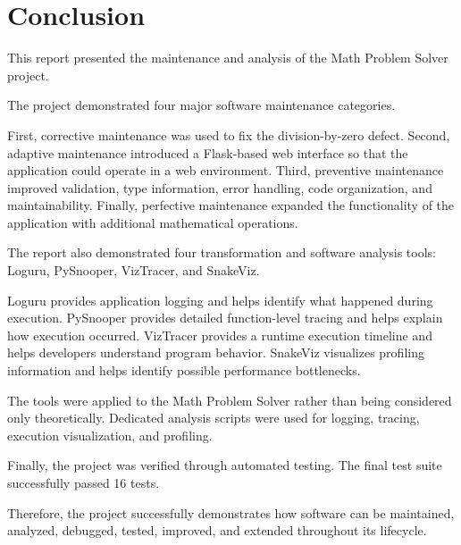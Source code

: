 \documentclass[12pt,a4paper]{report}
\begin{document}
\chapter{Conclusion}

This report presented the maintenance and analysis of the Math Problem
Solver project.

The project demonstrated four major software maintenance categories.

First, corrective maintenance was used to fix the division-by-zero
defect. Second, adaptive maintenance introduced a Flask-based web
interface so that the application could operate in a web environment.
Third, preventive maintenance improved validation, type information,
error handling, code organization, and maintainability. Finally,
perfective maintenance expanded the functionality of the application
with additional mathematical operations.

The report also demonstrated four transformation and software analysis
tools: Loguru, PySnooper, VizTracer, and SnakeViz.

Loguru provides application logging and helps identify what happened
during execution. PySnooper provides detailed function-level tracing
and helps explain how execution occurred. VizTracer provides a runtime
execution timeline and helps developers understand program behavior.
SnakeViz visualizes profiling information and helps identify possible
performance bottlenecks.

The tools were applied to the Math Problem Solver rather than being
considered only theoretically. Dedicated analysis scripts were used
for logging, tracing, execution visualization, and profiling.

Finally, the project was verified through automated testing. The final
test suite successfully passed 16 tests.

Therefore, the project successfully demonstrates how software can be
maintained, analyzed, debugged, tested, improved, and extended
throughout its lifecycle.

\end{document}

